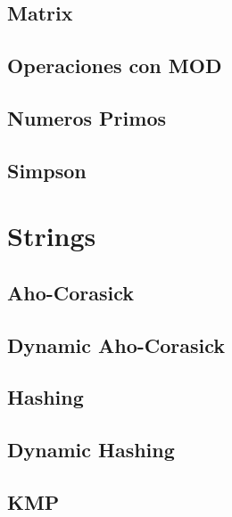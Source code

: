 \subsection{Matrix}
\raggedbottom
\hrulefill
\subsection{Operaciones con MOD}
\raggedbottom
\hrulefill
\subsection{Numeros Primos}
\raggedbottom
\hrulefill
\subsection{Simpson}
\raggedbottom
\hrulefill
\newpage

\section{Strings}
\subsection{Aho-Corasick}
\raggedbottom
\hrulefill
\subsection{Dynamic Aho-Corasick}
\raggedbottom
\hrulefill
\subsection{Hashing}
\raggedbottom
\hrulefill
\subsection{Dynamic Hashing}
\raggedbottom
\hrulefill
\subsection{KMP}
\raggedbottom
\hrulefill

